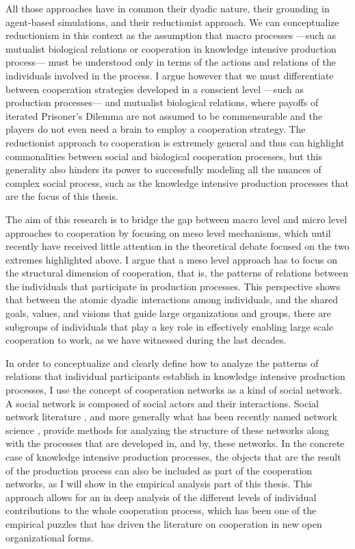 All those approaches have in common their dyadic nature, their grounding in agent-based simulations, and their reductionist approach. We can conceptualize reductionism in this context as the assumption that macro processes ---such as mutualist biological relations or cooperation in knowledge intensive production process--- must be understood only in terms of the actions and relations of the individuals involved in the process. I argue however that we must differentiate between cooperation strategies developed in a conscient level ---such as production processes--- and mutualist biological relations, where payoffs of iterated Prisoner's Dilemma are not assumed to be commensurable and the players do not even need a brain to employ a cooperation strategy. The reductionist approach to cooperation is extremely general and thus can highlight commonalities between social and biological cooperation processes, but this generality also hinders its power to successfully modeling all the nuances of complex social process, such as the knowledge intensive production processes that are the focus of this thesis.    

The aim of this research is to bridge the gap between macro level and micro level approaches to cooperation by focusing on meso level mechanisms, which until recently have received little attention in the theoretical debate focused on the two extremes highlighted above. I argue that a meso level approach has to focus on the structural dimension of cooperation, that is, the patterns of relations between the individuals that participate in production processes. This perspective shows that between the atomic dyadic interactions among individuals, and the shared goals, values, and visions that guide large organizations and groups, there are subgroups of individuals that play a key role in effectively enabling large scale cooperation to work, as we have witnessed during the last decades.

In order to conceptualize and clearly define how to analyze the patterns of relations that individual participants establish in knowledge intensive production processes, I use the concept of cooperation networks as a kind of social network. A social network is composed of social actors and their interactions. Social network literature \citep*{wasserman:1994, scott:2011}, and more generally what has been recently named network science \citep*{newman:2003, newman:2006, newman:2010, easley:2010}, provide methods for analyzing the structure of these networks along with the processes that are developed in, and by, these networks. In the concrete case of knowledge intensive production processes, the objects that are the result of the production process can also be included as part of the cooperation networks, as I will show in the empirical analysis part of this thesis. This approach allows for an in deep analysis of the different levels of individual contributions to the whole cooperation process, which has been one of the empirical puzzles that has driven the literature on cooperation in new open organizational forms.

